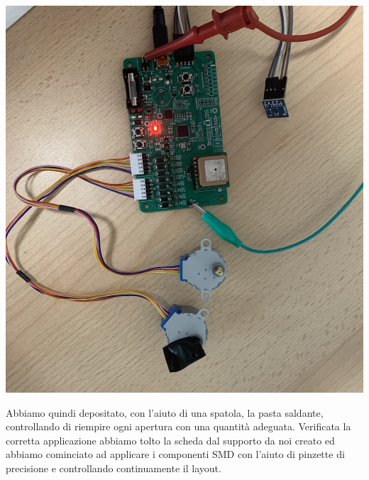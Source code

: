 \begin{center}
\includegraphics[scale=0.4]{figures/image101.png}
\captionsetup{type=figure}
\end{center}

Abbiamo quindi depositato, con l’aiuto di una spatola, la pasta saldante, 
controllando di riempire ogni apertura con una quantità adeguata. Verificata la 
corretta applicazione abbiamo tolto la scheda dal supporto da noi creato ed abbiamo 
cominciato ad applicare i componenti SMD con l’aiuto di pinzette di precisione e controllando 
continuamente il layout.

